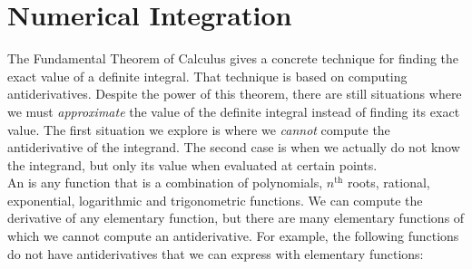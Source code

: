 \section{Numerical Integration}\label{sec:numerical_integration}


The Fundamental Theorem of Calculus gives a concrete technique for finding the exact value of a definite integral. That technique is based on computing antiderivatives. Despite the power of this theorem, there are still situations where we must \textit{approximate} the value of the definite integral instead of finding its exact value. The first situation we explore is where we \textit{cannot} compute the antiderivative of the integrand. The second case is when we actually do not know the integrand, but only its value when evaluated at certain points.\\ %


%
An  is any function that is a combination of polynomials, $n^{\text{th}}$ roots, rational, exponential, logarithmic and trigonometric functions. We can compute the derivative of any elementary function, but there are many elementary functions of which we cannot compute an antiderivative. For example, the following functions do not have antiderivatives that we can express with elementary functions:

